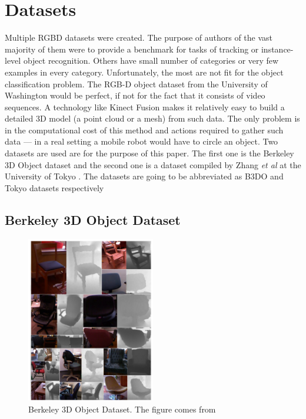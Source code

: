 \section{Datasets}

	Multiple RGBD datasets were created. The purpose of authors of the vast majority of them were to provide a benchmark for tasks of tracking or instance-level object recognition. Others have small number of categories or very few examples in every category. Unfortunately, the most are not fit for the object classification problem.
	The RGB-D object dataset from the University of Washington \cite{dataset_washington} would be perfect, if not for the fact that it consists of video sequences. A technology like Kinect Fusion \cite{KinectFusion} makes it relatively easy to build a detailed 3D model (a point cloud or a mesh) from such data. The only problem is in the computational cost of this method and actions required to gather such data --- in a real setting a mobile robot would have to circle an object. Two datasets are used are for the purpose of this paper. The first one is the Berkeley 3D Object dataset \cite{B3DO} and the second one is a dataset compiled by Zhang \emph{et al} at the University of Tokyo \cite{zhangcategory}. The datasets are going to be abbreviated as B3DO and Tokyo datasets respectively


	\subsection{Berkeley 3D Object Dataset}
	\begin{figure}[!ht]
	\centering
	\includegraphics[width=0.5\textwidth]{figs/b3do_dataset}
	\caption{Berkeley 3D Object Dataset. The figure comes from \cite{B3DO}}
	\label{fig:b3do}
	\end{figure}
	
